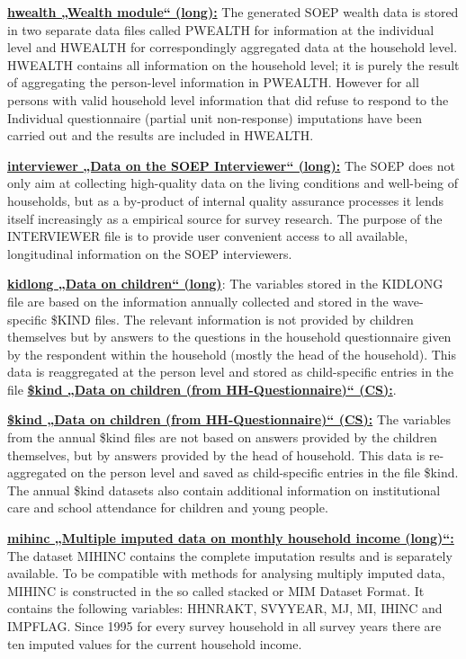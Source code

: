 \documentclass[letterpaper,10pt,openany,onesideH,english]{sphinxmanual}
\begin{document}
 \href{https://paneldata.org/soep-core/data/hwealth}{\textbf{hwealth „Wealth module“ (long):}} The generated SOEP wealth data is stored in two separate data files called PWEALTH for information at the individual level and HWEALTH for correspondingly aggregated data at the household level. HWEALTH contains all information on the household level; it is purely the result of aggregating the person-level information in PWEALTH. However for all persons with valid household level information that did refuse to respond to the Individual questionnaire (partial unit non-response) imputations have been carried out and the results are included in HWEALTH.

 \href{https://paneldata.org/soep-core/data/interviewer}{\textbf{interviewer „Data on the SOEP Interviewer“ (long):}} The SOEP does not only aim at collecting high-quality data on the living conditions and well-being of households, but \textendash{}as a by-product of internal quality assurance processes\textendash{} it lends itself increasingly as a empirical source for survey research. The purpose of the INTERVIEWER file is to provide user convenient access to all available, longitudinal information on the SOEP interviewers.

 \href{https://paneldata.org/soep-core/data/kidlong}{\textbf{kidlong „Data on children“ (long)}}: The variables stored in the KIDLONG file are based on the information annually collected and stored in the wave-specific \$KIND files. The relevant information is not provided by children themselves but by answers to the questions in the household questionnaire given by the respondent within the household (mostly the head of the household). This data is reaggregated at the person level and stored as child-specific entries in the file  \href{https://paneldata.org/soep-core/data/bgkind}{\textbf{\$kind „Data on children (from HH-Questionnaire)“ (CS):}}.

 \href{https://paneldata.org/soep-core/data/bgkind}{\textbf{\$kind „Data on children (from HH-Questionnaire)“ (CS):}} The variables from the annual \$kind files  are not based on answers provided by the children themselves, but by answers   provided by the head of household. This data is re-aggregated on the person level and saved as child-specific entries in the file \$kind. The annual \$kind datasets also contain additional information on institutional care and school attendance for children and young people.

 \href{https://paneldata.org/soep-core/data/mihinc}{\textbf{mihinc „Multiple imputed data on monthly household income (long)“:}} The dataset MIHINC contains the complete imputation results and is separately available. To be compatible with methods for analysing multiply imputed data, MIHINC is constructed in the so called stacked or MIM Dataset Format. It contains the following variables: HHNRAKT, SVYYEAR, MJ, MI, IHINC and IMPFLAG. Since 1995 for every survey household in all survey years there are ten imputed values for the current household income.
\end{document}
